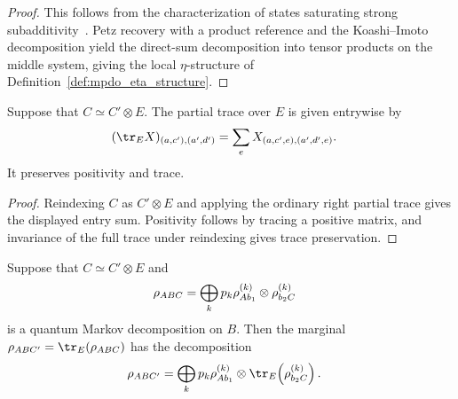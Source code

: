 \begin{proof}
    \leanok
    This follows from the characterization of states saturating strong
    subadditivity~\cite{Hayden2004Structure}. Petz recovery with a product
    reference and the Koashi--Imoto decomposition yield the direct-sum
    decomposition into tensor products on the middle system, giving the local
    $\eta$-structure of Definition~\ref{def:mpdo_eta_structure}.
\end{proof}

\begin{lemma}
    \label{lem:partial_trace_right_along}
    \leanok
    Suppose that $C\simeq C'\otimes E$. The partial trace over $E$ is given
    entrywise by
    \begin{align}
        (\tr_E X)_{(a,c'),(a',d')}
         & =\sum_e X_{(a,c',e),(a',d',e)}.
        \notag
    \end{align}
    It preserves positivity and trace.
\end{lemma}

\begin{proof}
    \leanok
    Reindexing $C$ as $C'\otimes E$ and applying the ordinary right partial
    trace gives the displayed entry sum. Positivity follows by tracing a
    positive matrix, and invariance of the full trace under reindexing gives
    trace preservation.
\end{proof}

\begin{lemma}
    \label{thm:quantum_markov_right_marginal}
    \leanok
    Suppose that $C\simeq C'\otimes E$ and
    \begin{align}
        \rho_{ABC}
         & =\bigoplus_k p_k\rho_{A b_1}^{(k)}
        \otimes\rho_{b_2 C}^{(k)}
        \notag
    \end{align}
    is a quantum Markov decomposition on $B$. Then the marginal
    $\rho_{ABC'}=\tr_E(\rho_{ABC})$ has the decomposition
    \begin{align}
        \rho_{ABC'}
         & =\bigoplus_k p_k\rho_{A b_1}^{(k)}
        \otimes\tr_E\!\left(\rho_{b_2 C}^{(k)}\right).
        \notag
    \end{align}
\end{lemma}

